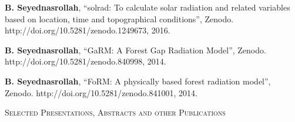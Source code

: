 \documentclass[10pt]{article}
\newenvironment{changemargin}[2]{%
  \begin{list}{}{%
    \setlength{\topsep}{0pt}%
    \setlength{\leftmargin}{#1}%
    \setlength{\rightmargin}{#2}%
    \setlength{\listparindent}{\parindent}%
    \setlength{\itemindent}{\parindent}%
    \setlength{\parsep}{\parskip}%
  }%
  \item[]}{\end{list}
}
\newcommand{\lineover}{
	\begin{changemargin}{-0.05in}{-0.05in}
		\vspace*{-8pt}
		\hrulefill \\
		\vspace*{-2pt}
	\end{changemargin}
}
\newcommand{\header}[1]{
	\begin{changemargin}{-0.5in}{-0.5in}
		\scshape{#1}\\
  	\lineover
	\end{changemargin}
}
\newenvironment{body} {
	\vspace*{-2pt}
	\begin{changemargin}{-0.5in}{-0.5in}
  }
	{\end{changemargin}
}
\begin{document}
\begin{body}
   \textbf{B. Seyednasrollah}, ``solrad: To calculate solar radiation and related variables based on location, time and topographical conditions'', Zenodo. http://doi.org/10.5281/zenodo.1249673, 2016. \\ \medskip

   \textbf{B. Seyednasrollah}, ``GaRM: A Forest Gap Radiation Model'', Zenodo. http://doi.org/10.5281/zenodo.840998, 2014. \\ \medskip

   \textbf{B. Seyednasrollah}, ``FoRM: A physically based forest radiation model'', Zenodo. http://doi.org/10.5281/zenodo.841001, 2014. \\
   \medskip

\end{body}

\medskip

\header{Selected Presentations, Abstracts and other Publications}
\end{document}
